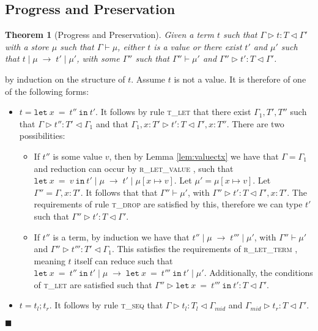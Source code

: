 \documentclass{article}
\newtheorem{thm}{Theorem}
\newcommand{\lemref}[1]{Lemma \ref{#1}}
\newcommand{\rlett}{\textsc{r\_let\_term} }
\newcommand{\rletv}{\textsc{r\_let\_value} }
\newcommand{\tlet}{\textsc{t\_let} }
\newcommand{\tseq}{\textsc{t\_seq} }
\newcommand{\tdrop}{\textsc{t\_drop} }
\newcommand{\typerule}[4]{#1 \triangleright #2 : #3 \triangleleft #4}
\newcommand{\oprule}[4]{#1 \mid #2\;\longrightarrow\;#3 \mid #4}
\newcommand{\lett}[3]{\mathtt{let}\:#1\:\mathtt{=}\:#2\:\mathtt{in}\:#3}
\newcommand{\qed}{$\blacksquare$}
\newenvironment{proof}{\vspace{1ex}\noindent{\bf Proof}\hspace{0.5em}}
  {\hfill\qed\vspace{1ex}}
\begin{document}
\subsection{Progress and Preservation}

\begin{thm}[Progress and Preservation]
Given a term $t$ such that $\typerule{\Gamma}{t}{T}{\Gamma'}$
with a store $\mu$ such that $\Gamma \vdash \mu$, either $t$ is a value or 
there exist $t'$ and $\mu'$ such that
$\oprule{t}{\mu}{t'}{\mu'}$, with some $\Gamma''$ such that
$\Gamma'' \vdash \mu'$ and $\typerule{\Gamma''}{t'}{T}{\Gamma'}$.
\end{thm}

\begin{proof}
by induction on the structure of $t$. Assume $t$ is not a value. It is
therefore of one of the following forms:

\begin{itemize}
\item $t = \lett{x}{t''}{t'}$. 
It follows by rule \tlet that there exist $\Gamma_1, T', T''$
such that
$\typerule{\Gamma}{t''}{T'}{\Gamma_1}$ and that
$\typerule{\Gamma_1, x : T'}{t'}{T}{\Gamma', x : T''}$. There are two
possibilities:

	\begin{itemize}
	\item If $t''$ is some value $v$, then by \lemref{lem:valuectx} 
	we have that $\Gamma = \Gamma_1$ and reduction can occur
	by \rletv, such that 
	$\oprule{\lett{x}{v}{t'}}{\mu}{t'}{\mu [ x \mapsto v ]}$.
	Let $\mu' = \mu [ x \mapsto v ]$. Let $\Gamma'' = \Gamma, x : T'$.
	It follows that that $\Gamma'' \vdash \mu'$, with
	$\typerule{\Gamma''}{t'}{T}{\Gamma', x : T'}$.
	The requirements of rule \tdrop are satisfied by this, therefore we can 
	type $t'$ such that $\typerule{\Gamma''}{t'}{T}{\Gamma'}$.

	\item If $t''$ is a term, 
	by induction we have that $\oprule{t''}{\mu}{t'''}{\mu'}$, with
	$\Gamma'' \vdash \mu'$ and $\typerule{\Gamma''}{t'''}{T'}{\Gamma_1}$.
	This satisfies the requirements of \rlett, meaning $t$ itself can reduce
	such that $\oprule{\lett{x}{t''}{t'}}{\mu}{\lett{x}{t'''}{t'}}{\mu'}$.
	Additionally, the conditions of \tlet are satisfied such that
	$\typerule{\Gamma''}{\lett{x}{t'''}{t'}}{T}{\Gamma'}$.

	\end{itemize}

\item $t = t_l ; t_r$. It follows by rule
\tseq that $\typerule{\Gamma}{t_l}{T_l}{\Gamma_{mid}}$ and
$\typerule{\Gamma_{mid}}{t_r}{T}{\Gamma'}$.


\end{itemize}
\end{proof}
\end{document}

